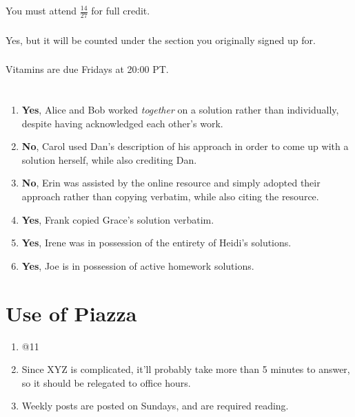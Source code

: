 \documentclass{article}
\begin{document}
You must attend \(\frac{14}{27}\) for full credit.

\subsubsection{}

Yes, but it will be counted under the section you originally signed up for.

\subsubsection{}

Vitamins are due Fridays at 20:00 PT.

\section{}

\begin{enumerate}
    \item \textbf{Yes}, Alice and Bob worked \emph{together} on a solution rather than individually, despite having acknowledged each other's work.
    \item \textbf{No}, Carol used Dan's description of his approach in order to come up with a solution herself, while also crediting Dan.
    \item \textbf{No}, Erin was assisted by the online resource and simply adopted their approach rather than copying verbatim, while also citing the resource.
    \item \textbf{Yes}, Frank copied Grace's solution verbatim.
    \item \textbf{Yes}, Irene was in possession of the entirety of Heidi's solutions.
    \item \textbf{Yes}, Joe is in possession of active homework solutions.
\end{enumerate}

\section{Use of Piazza}

\begin{enumerate}
    \item @11
    \item Since XYZ is complicated, it'll probably take more than 5 minutes to answer, so it should be relegated to office hours.
    \item Weekly posts are posted on Sundays, and are required reading.
\end{enumerate}
\end{document}

